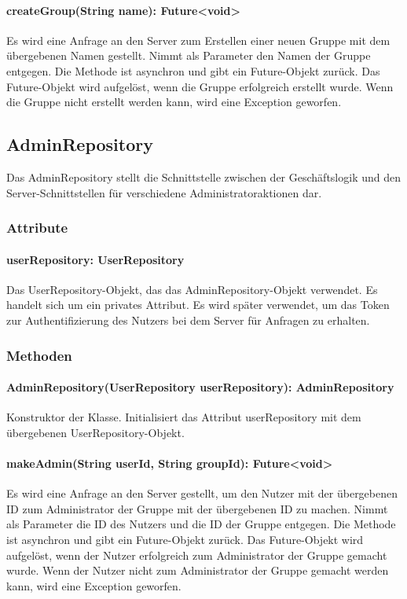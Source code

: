 \documentclass[parskip=full]{scrartcl}
\begin{document}
\paragraph{createGroup(String name): Future<void>}
Es wird eine Anfrage an den Server zum Erstellen einer neuen Gruppe mit dem übergebenen Namen gestellt. Nimmt als Parameter den Namen der Gruppe entgegen. Die Methode ist asynchron und gibt ein Future-Objekt zurück. Das Future-Objekt wird aufgelöst, wenn die Gruppe erfolgreich erstellt wurde. Wenn die Gruppe nicht erstellt werden kann, wird eine Exception geworfen.

\newpage
\subsection{AdminRepository}
Das AdminRepository stellt die Schnittstelle zwischen der Geschäftslogik und den Server-Schnittstellen für verschiedene Administratoraktionen dar.
\subsubsection*{Attribute}
\paragraph{userRepository: UserRepository}
Das UserRepository-Objekt, das das AdminRepository-Objekt verwendet. Es handelt sich um ein privates Attribut. Es wird später verwendet, um das Token zur Authentifizierung des Nutzers bei dem Server für Anfragen zu erhalten.
\subsubsection*{Methoden}
\paragraph{AdminRepository(UserRepository userRepository): AdminRepository}
Konstruktor der Klasse. Initialisiert das Attribut userRepository mit dem übergebenen UserRepository-Objekt.
\paragraph{makeAdmin(String userId, String groupId): Future<void>}
Es wird eine Anfrage an den Server gestellt, um den Nutzer mit der übergebenen ID zum Administrator der Gruppe mit der übergebenen ID zu machen. Nimmt als Parameter die ID des Nutzers und die ID der Gruppe entgegen. Die Methode ist asynchron und gibt ein Future-Objekt zurück. Das Future-Objekt wird aufgelöst, wenn der Nutzer erfolgreich zum Administrator der Gruppe gemacht wurde. Wenn der Nutzer nicht zum Administrator der Gruppe gemacht werden kann, wird eine Exception geworfen.
\end{document}
